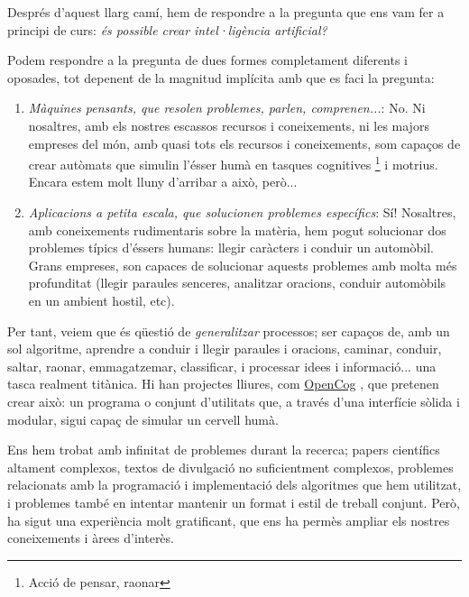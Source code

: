 Després d'aquest llarg camí, hem de respondre a la pregunta que ens vam fer a principi de curs:
\emph{és possible crear intel·ligència artificial?}

Podem respondre a la pregunta de dues formes completament diferents i oposades, tot depenent
de la magnitud implícita amb que es faci la pregunta:
\begin{enumerate}
\item \emph{Màquines pensants, que resolen problemes, parlen, comprenen...}: No. Ni nosaltres,
amb els nostres escassos recursos i coneixements, ni les majors empreses del món, amb quasi tots
els recursos i coneixements, som capaços de crear autòmats que simulin l'ésser humà en tasques
cognitives \footnote{Acció de pensar, raonar} i motrius. Encara estem molt lluny d'arribar a això, però...
\item \emph{Aplicacions a petita escala, que solucionen problemes específics}: Sí! Nosaltres,
amb coneixements rudimentaris sobre la matèria, hem pogut solucionar dos problemes típics d'éssers humans:
llegir caràcters i conduir un automòbil. Grans empreses, son capaces de solucionar aquests problemes amb
molta més profunditat (llegir paraules senceres, analitzar oracions, conduir automòbils en un ambient hostil, etc).
\end{enumerate}

Per tant, veiem que és qüestió de \emph{generalitzar} processos; ser capaços de, amb un sol algoritme,
aprendre a conduir i llegir paraules i oracions, caminar, conduir, saltar, raonar, emmagatzemar, classificar,
i processar idees i informació... una tasca realment titànica. Hi han projectes lliures, com \href{http://opencog.org/}{OpenCog}
, que
pretenen crear això: un programa o conjunt d'utilitats que, a través d'una interfície sòlida i modular, sigui
capaç de simular un cervell humà.

Ens hem trobat amb infinitat de problemes durant la recerca; papers científics altament complexos,
textos de divulgació no suficientment complexos, problemes relacionats amb la programació i implementació
dels algoritmes que hem utilitzat, i problemes també en intentar mantenir un format i estil de treball
conjunt. Però, ha sigut una experiència molt gratificant, que ens ha permès ampliar els nostres coneixements
i àrees d'interès.
